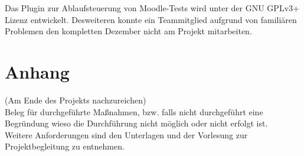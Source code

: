 \documentclass[accentcolor=tud0b,12pt,paper=a4]{tudreport}
\begin{document}
	Das Plugin zur Ablaufsteuerung von Moodle-Tests wird unter der GNU GPLv3+ Lizenz entwickelt.
	Desweiteren konnte ein Teammitglied aufgrund von familiären Problemen den kompletten Dezember nicht am Projekt mitarbeiten.
			
	
\appendix
	\chapter{Anhang}
		(Am Ende des Projekts nachzureichen)\\
		Beleg für durchgeführte Maßnahmen, bzw. falls nicht durchgeführt eine Begründung wieso die Durchführung nicht möglich oder nicht erfolgt ist. \\
		Weitere Anforderungen sind den Unterlagen und der Vorlesung zur Projektbegleitung zu entnehmen.
	

		
	
\end{document}

